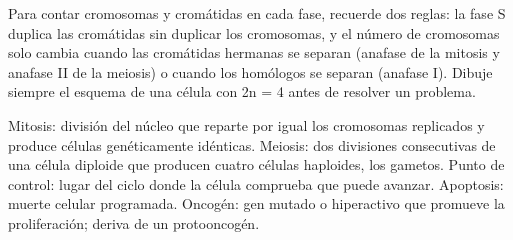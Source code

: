 \documentclass{book}
\begin{document}

\begin{tcolorbox}[title={Consejo}, studiumtip, breakable]

Para contar cromosomas y cromátidas en cada fase, recuerde dos reglas: la fase S duplica las cromátidas sin duplicar los cromosomas, y el número de cromosomas solo cambia cuando las cromátidas hermanas se separan (anafase de la mitosis y anafase II de la meiosis) o cuando los homólogos se separan (anafase I). Dibuje siempre el esquema de una célula con 2n = 4 antes de resolver un problema.

\end{tcolorbox}

\begin{tcolorbox}[title={Definición}, studiumdef, breakable]

Mitosis: división del núcleo que reparte por igual los cromosomas replicados y produce células genéticamente idénticas. Meiosis: dos divisiones consecutivas de una célula diploide que producen cuatro células haploides, los gametos. Punto de control: lugar del ciclo donde la célula comprueba que puede avanzar. Apoptosis: muerte celular programada. Oncogén: gen mutado o hiperactivo que promueve la proliferación; deriva de un protooncogén.

\end{tcolorbox}
\end{document}
